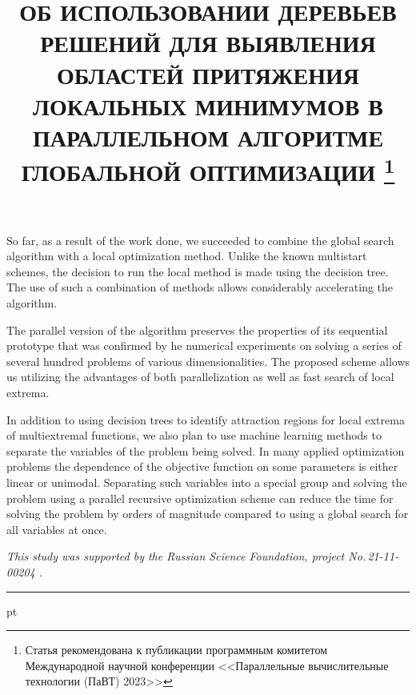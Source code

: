 \documentclass{cmi}
\begin{document}
So far, as a result of the work done, we succeeded to combine the global search algorithm with a local  optimization method.  Unlike the known multistart schemes, the decision to run the local method is made using the decision  tree. The use of such a combination of methods allows considerably accelerating the algorithm. 

The parallel version of the algorithm preserves the properties of its sequential prototype that was  confirmed by he numerical experiments on solving a series of several hundred problems of various  dimensionalities. The proposed scheme allows us utilizing the advantages of both parallelization as well as fast search of local extrema.

In addition to using decision trees to identify attraction regions for local extrema of multiextremal functions, we also plan to use machine learning methods to separate the variables of the problem being solved. In many applied optimization problems the dependence of the objective function on some parameters is either linear or unimodal. Separating such variables into a special group and solving the problem using a parallel recursive optimization scheme  can reduce the time for solving the problem by orders of magnitude compared to using a global search for all variables at once.

\vspace{1em}
{\it This study was supported by the Russian Science Foundation, project No.\,21-11-00204 .}









\insertbiblioen
{}

{\phantom{eee} \hrule {} pt}



\title{ОБ ИСПОЛЬЗОВАНИИ ДЕРЕВЬЕВ РЕШЕНИЙ ДЛЯ ВЫЯВЛЕНИЯ ОБЛАСТЕЙ ПРИТЯЖЕНИЯ ЛОКАЛЬНЫХ МИНИМУМОВ В ПАРАЛЛЕЛЬНОМ АЛГОРИТМЕ ГЛОБАЛЬНОЙ ОПТИМИЗАЦИИ%
	\footnote{Статья рекомендована к публикации программным комитетом Международной научной конференции <<Параллельные вычислительные технологии (ПаВТ) 2023>>}%
}
\end{document}
